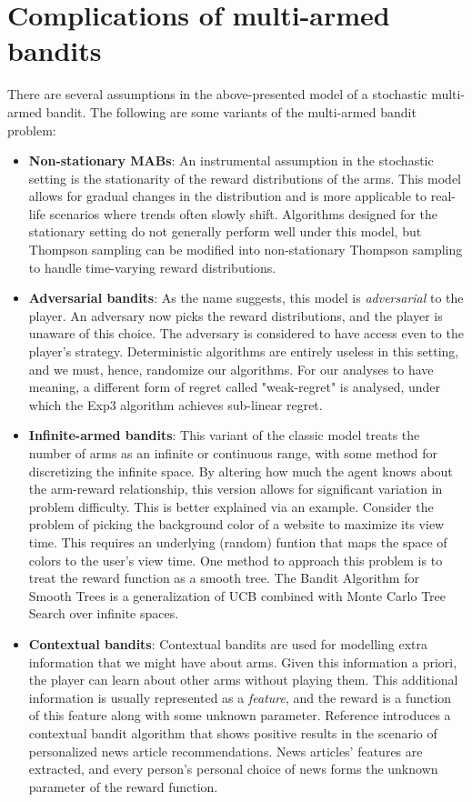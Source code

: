\documentclass[conference]{IEEEtran}
\begin{document}
\section{Complications of multi-armed bandits}
There are several assumptions in the above-presented model of a stochastic multi-armed bandit. The following are some variants of the multi-armed bandit problem:
\begin{itemize}
    \item \textbf{Non-stationary MABs}: An instrumental assumption in the stochastic setting is the stationarity of the reward distributions of the arms. This model allows for gradual changes in the distribution and is more applicable to real-life scenarios where trends often slowly shift. Algorithms designed for the stationary setting do not generally perform well under this model, but Thompson sampling can be modified into non-stationary Thompson sampling \cite{thompson_sampling} to handle time-varying reward distributions.
    \item \textbf{Adversarial bandits}: As the name suggests, this model is \textit{adversarial} to the player. An adversary now picks the reward distributions, and the player is unaware of this choice. The adversary is considered to have access even to the player's strategy. Deterministic algorithms are entirely useless in this setting, and we must, hence, randomize our algorithms. For our analyses to have meaning, a different form of regret called "weak-regret" is analysed, under which the Exp3 algorithm \cite{exp3} achieves sub-linear regret.
    \item \textbf{Infinite-armed bandits}: This variant of the classic model treats the number of arms as an infinite or continuous range, with some method for discretizing the infinite space. By altering how much the agent knows about the arm-reward relationship, this version allows for significant variation in problem difficulty. This is better explained via an example. Consider the problem of picking the background color of a website to maximize its view time. This requires an underlying (random) funtion that maps the space of colors to the user's view time. One method to approach this problem is to treat the reward function as a smooth tree. The Bandit Algorithm for Smooth Trees \cite{bast} is a generalization of UCB combined with Monte Carlo Tree Search over infinite spaces.
    \item \textbf{Contextual bandits}: Contextual bandits are used for modelling extra information that we might have about arms. Given this information a priori, the player can learn about other arms without playing them. This additional information is usually represented as a \textit{feature}, and the reward is a function of this feature along with some unknown parameter. Reference \cite{contextual} introduces a contextual bandit algorithm that shows positive results in the scenario of personalized news article recommendations. News articles' features are extracted, and every person's personal choice of news forms the unknown parameter of the reward function.
\end{itemize}
\end{document}
